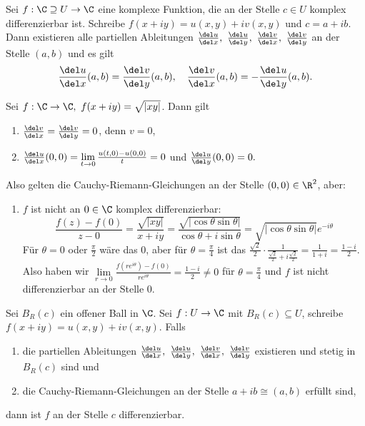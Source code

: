 		\begin{thmn}
			Sei $ f: \C \supseteq U \to \C $ eine komplexe Funktion, die an der Stelle $ c \in U $ komplex differenzierbar ist. Schreibe $ f(x+iy) = u(x,y) + iv(x,y) $ und $ c = a+ib $. Dann existieren alle partiellen Ableitungen $ \frac{\del u}{\del x},\ \frac{\del u}{\del y},\ \frac{\del v}{\del x},\ \frac{\del v}{\del y} $ an der Stelle $ (a,b) $ und es gilt 
			$$ \frac{\del u}{\del x}(a,b) = \frac{\del v}{\del y}(a,b),\quad \frac{\del v}{\del x}(a,b) = - \frac{\del u}{\del y}(a,b). $$
		\end{thmn}
		
		\begin{exmp}
			Sei $ f:\C \to \C,\ f(x+iy) = \sqrt{|xy|} $. Dann gilt 
			\begin{enumerate}
				\item $ \frac{\del v}{\del x} = \frac{\del v}{\del y} = 0 $, denn $ v = 0 $,
				\item $ \frac{\del u}{\del x}(0,0) = \lim\limits_{t \to 0} \frac{u(t,0) - u(0,0)}{t} = 0 $ und $ \frac{\del u}{\del y}(0,0) = 0. $
			\end{enumerate}
			Also gelten die Cauchy-Riemann-Gleichungen an der Stelle $ (0,0) \in \R^2 $, aber:
			\begin{enumerate}[resume] 
				\item $f$ ist nicht an $ 0 \in \C $ komplex differenzierbar: 
				$$ \frac{f(z) - f(0)}{z-0} = \frac{\sqrt{|xy|}}{x+iy} = \frac{\sqrt{|\cos\theta\sin\theta|}}{\cos\theta + i\sin\theta} = \sqrt{|\cos\theta\sin\theta|}e^{-i\theta} $$
				Für $ \theta = 0 $ oder $ \frac{\pi}{2} $ wäre das $0$, aber für $ \theta = \frac{\pi}{4} $ ist das $ \frac{\sqrt{2}}{2} \cdot \frac{1}{\frac{\sqrt{2}}{2} + i\frac{\sqrt{2}}{2}} = \frac{1}{1+i} = \frac{1-i}{2}. $ Also haben wir $ \lim\limits_{r \to 0} \frac{f(re^{i\theta}) - f(0)}{re^{i\theta}} = \frac{1-i}{2} \neq 0 $ für $ \theta = \frac{\pi}{4} $ und $f$ ist nicht differenzierbar an der Stelle $0$.
			\end{enumerate}
		\end{exmp}
		
		\begin{thm}
			Sei $ B_R(c) $ ein offener Ball in $\C$. Sei $ f: U \to \C $ mit $ B_R(c) \subseteq U $, schreibe $ f(x+iy) = u(x,y) + iv(x,y) $. Falls 
			\begin{enumerate}[label={\roman*})]
				\item die partiellen Ableitungen $ \frac{\del u}{\del x},\ \frac{\del u}{\del y},\ \frac{\del v}{\del x},\ \frac{\del v}{\del y} $ existieren und stetig in $ B_R(c) $ sind und
				\item die Cauchy-Riemann-Gleichungen an der Stelle $ a+ib \cong (a,b) $ erfüllt sind,
			\end{enumerate}
			dann ist $f$ an der Stelle $c$ differenzierbar.
		\end{thm}
		
